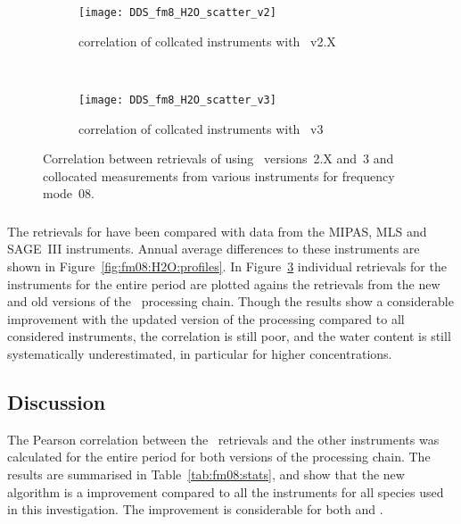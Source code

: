 \begin{figure}[htpb]
    \centering
    \begin{subfigure}[b]{0.49\textwidth}
        \texttt{[image: DDS\_fm8\_H2O\_scatter\_v2]}
        \caption{correlation of collcated instruments with \smr~v2.X}
        \label{fig:fm08:H2O:scatter:v2}
    \end{subfigure}
    \,
    \begin{subfigure}[b]{0.49\textwidth}
        \texttt{[image: DDS\_fm8\_H2O\_scatter\_v3]}
        \caption{correlation of collcated instruments with \smr~v3}
        \label{fig:fm08:H2O:scatter:v3}
    \end{subfigure}
    \caption{Correlation between retrievals of  using \smr\
    versions~2.X and~3 and collocated measurements from various instruments
    for frequency mode~08.}
    \label{fig:fm08:H2O:scatter}
\end{figure}

\subsubsection{}
\label{sec:fm08:comparison:H2O}
The retrievals for \chem{H_2O} have been compared with data from the MIPAS,
MLS and SAGE~III instruments. Annual average differences to these instruments
are shown in Figure~\ref{fig:fm08:H2O:profiles}. In
Figure~\ref{fig:fm08:H2O:scatter} individual retrievals for the instruments for
the entire period are plotted agains the retrievals from the new and old
versions of the \smr\ processing chain. Though the results show a considerable
improvement with the updated version of the processing compared to all
considered instruments, the correlation is still poor, and the water content is
still systematically underestimated, in particular for higher concentrations.


\subsection{Discussion}
\label{sec:fm08:discussion}
The Pearson correlation between the \smr\ retrievals and the other instruments
was calculated for the entire period for both versions of the processing chain.
The results are summarised in Table~\ref{tab:fm08:stats}, and show that the
new algorithm is a improvement compared to all the instruments for all species
used in this investigation. The improvement is considerable for both \chem{O_3}
and \chem{H_2O}.


